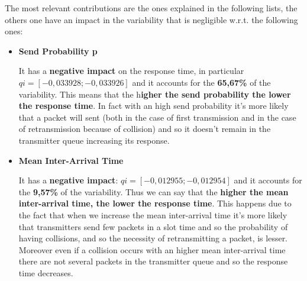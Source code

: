 \noindent %




\noindent The most relevant contributions are the ones explained in the following lists, the others one have an impact in the variability that is negligible w.r.t. the following ones: 

\begin{itemize}
	\item \textbf{Send Probability p}
	
	\noindent It has a \textbf{negative impact} on the response time, in particular $qi = [-0,033928; -0,033926]$ and it accounts for the \textbf{65,67\%} of the variability. This means that the h\textbf{igher the send probability the lower the response time}. In fact with an high send probability it's more likely that a packet will sent (both in the case of first transmission and in the case of retransmission because of collision) and so it doesn't remain in the transmitter queue increasing its response.  
	
	\item \textbf{Mean Inter-Arrival Time}
	
	\noindent It has a \textbf{negative impact}: $qi = [-0,012955; -0,012954]$ and it accounts for the \textbf{9,57\%} of the variability. Thus we can say that the \textbf{higher the mean inter-arrival time, the lower the response time}. This happens due to the fact that when we increase the mean inter-arrival time it's more likely that transmitters send few packets in a slot time and so the probability of having collisions, and so the necessity of retransmitting a packet, is lesser. Moreover even if a collision occurs with an higher mean inter-arrival time there are not several packets in the transmitter queue and so the response time decreases. 
\end{itemize}

